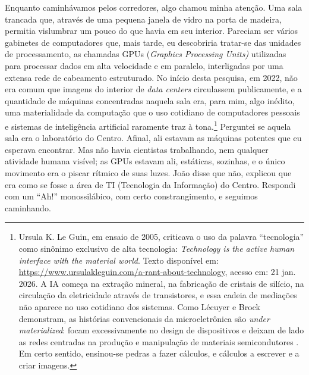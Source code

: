Enquanto caminhávamos pelos corredores, algo chamou minha atenção. Uma sala trancada que, através de uma pequena janela de vidro na porta de madeira, permitia vislumbrar um pouco do que havia em seu interior. Pareciam ser vários gabinetes de computadores que, mais tarde, eu descobriria tratar-se das unidades de processamento, as chamadas GPUs (\textit{Graphics Processing Units)} utilizadas para processar dados em alta velocidade e em paralelo, interligadas por uma extensa rede de cabeamento estruturado. No início desta pesquisa, em 2022, não era comum que imagens do interior de \textit{data centers} circulassem publicamente, e a quantidade de máquinas concentradas naquela sala era, para mim, algo inédito, uma materialidade da computação que o uso cotidiano de computadores pessoais e sistemas de inteligência artificial raramente traz à tona.\footnote{Ursula K. Le Guin, em ensaio de 2005, criticava o uso da palavra \enquote{tecnologia} como sinônimo exclusivo de alta tecnologia: \textit{Technology is the active human interface with the material world}. Texto disponível em: \url{https://www.ursulakleguin.com/a-rant-about-technology}, acesso em: 21 jan. 2026. A IA começa na extração mineral, na fabricação de cristais de silício, na circulação da eletricidade através de transistores, e essa cadeia de mediações não aparece no uso cotidiano dos sistemas. Como Lécuyer e Brock demonstram, as histórias convencionais da microeletrônica são \textit{under materialized}: focam excessivamente no design de dispositivos e deixam de lado as redes centradas na produção e manipulação de materiais semicondutores \parencite{LecuyerBrock2006Materiality}. Em certo sentido, ensinou-se pedras a fazer cálculos, e cálculos a escrever e a criar imagens.} Perguntei se aquela sala era o laboratório do Centro. Afinal, ali estavam as máquinas potentes que eu esperava encontrar. Mas não havia cientistas trabalhando, nem qualquer atividade humana visível; as GPUs estavam ali, estáticas, sozinhas, e o único movimento era o piscar rítmico de suas luzes. João disse que não, explicou que era como se fosse a área de TI (Tecnologia da Informação) do Centro. Respondi com um ``Ah!'' monossilábico, com certo constrangimento, e seguimos caminhando.

